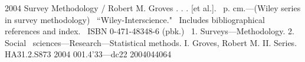 



\frontmatter


\subtitle{MAT2040 Notebook}



\halftitlepage
\titlepage



% 
 \begin{copyrightpage}{2004}
 Survey Methodology / Robert M. Groves . . . [et al.].
 \       p. cm.---(Wiley series in survey methodology)
 \    ``Wiley-Interscience."
 \    Includes bibliographical references and index.
 \    ISBN 0-471-48348-6 (pbk.)
 \    1. Surveys---Methodology.  2. Social 
 \  sciences---Research---Statistical methods.  I. Groves, Robert M.  II. %
 Series.\\

 HA31.2.S873 2004
 001.4'33---dc22                                             2004044064
 \end{copyrightpage}

